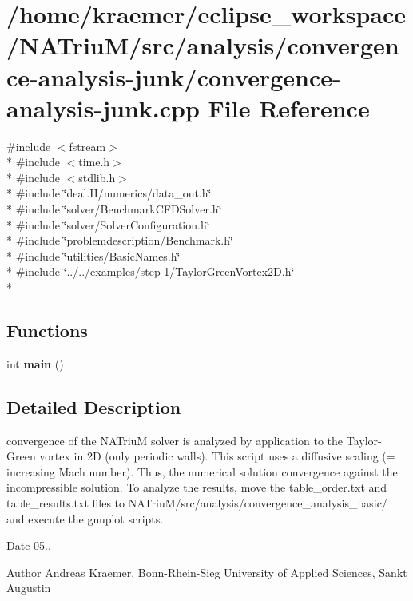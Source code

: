 \hypertarget{convergence-analysis-junk_8cpp}{\section{/home/kraemer/eclipse\-\_\-workspace/\-N\-A\-Triu\-M/src/analysis/convergence-\/analysis-\/junk/convergence-\/analysis-\/junk.cpp File Reference}
\label{convergence-analysis-junk_8cpp}
}
{\ttfamily \#include $<$fstream$>$}\\*
{\ttfamily \#include $<$time.\-h$>$}\\*
{\ttfamily \#include $<$stdlib.\-h$>$}\\*
{\ttfamily \#include \char`\"{}deal.\-I\-I/numerics/data\-\_\-out.\-h\char`\"{}}\\*
{\ttfamily \#include \char`\"{}solver/\-Benchmark\-C\-F\-D\-Solver.\-h\char`\"{}}\\*
{\ttfamily \#include \char`\"{}solver/\-Solver\-Configuration.\-h\char`\"{}}\\*
{\ttfamily \#include \char`\"{}problemdescription/\-Benchmark.\-h\char`\"{}}\\*
{\ttfamily \#include \char`\"{}utilities/\-Basic\-Names.\-h\char`\"{}}\\*
{\ttfamily \#include \char`\"{}../../examples/step-\/1/\-Taylor\-Green\-Vortex2\-D.\-h\char`\"{}}\\*
\subsection*{Functions}
\begin{DoxyCompactItemize}
\item 
\hypertarget{convergence-analysis-junk_8cpp_ae66f6b31b5ad750f1fe042a706a4e3d4}{int {\bfseries main} ()}\label{convergence-analysis-junk_8cpp_ae66f6b31b5ad750f1fe042a706a4e3d4}

\end{DoxyCompactItemize}


\subsection{Detailed Description}
convergence of the N\-A\-Triu\-M solver is analyzed by application to the Taylor-\/\-Green vortex in 2\-D (only periodic walls). This script uses a diffusive scaling (= increasing Mach number). Thus, the numerical solution convergence against the incompressible solution. To analyze the results, move the table\-\_\-order.\-txt and table\-\_\-results.\-txt files to N\-A\-Triu\-M/src/analysis/convergence\-\_\-analysis\-\_\-basic/ and execute the gnuplot scripts. \begin{DoxyDate}{Date}
05.. 
\end{DoxyDate}
\begin{DoxyAuthor}{Author}
Andreas Kraemer, Bonn-\/\-Rhein-\/\-Sieg University of Applied Sciences, Sankt Augustin 
\end{DoxyAuthor}
